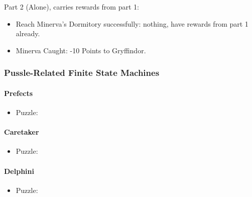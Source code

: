 Part 2 (Alone), carries rewards from part 1:

\begin{itemize}
	\item Reach Minerva's Dormitory successfully: nothing, have rewards from part 1 already.
	\item Minerva Caught: -10 Points to Gryffindor.
\end{itemize}

\pagebreak
\subsubsection{Pussle-Related Finite State Machines}

\paragraph{Prefects}
\begin{itemize}
\item Puzzle: 
\end{itemize}
\pagebreak

\paragraph{Caretaker}
\begin{itemize}
\item Puzzle: 
\end{itemize}
\pagebreak

\paragraph{Delphini}
\begin{itemize}
\item Puzzle: 
\end{itemize}
\pagebreak